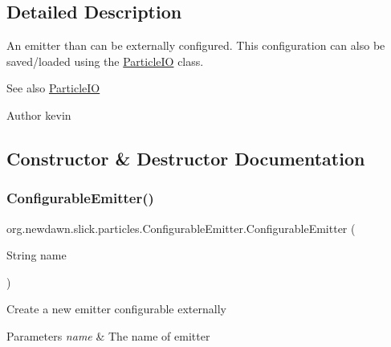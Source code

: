 \subsection{Detailed Description}
An emitter than can be externally configured. This configuration can also be saved/loaded using the \mbox{\hyperlink{classorg_1_1newdawn_1_1slick_1_1particles_1_1_particle_i_o}{Particle\+IO}} class.

\begin{DoxySeeAlso}{See also}
\mbox{\hyperlink{classorg_1_1newdawn_1_1slick_1_1particles_1_1_particle_i_o}{Particle\+IO}}
\end{DoxySeeAlso}
\begin{DoxyAuthor}{Author}
kevin 
\end{DoxyAuthor}


\subsection{Constructor \& Destructor Documentation}
\mbox{\label{classorg_1_1newdawn_1_1slick_1_1particles_1_1_configurable_emitter_ad86bb9c713312612cc48cf2097a50196}} 
\subsubsection{\texorpdfstring{Configurable\+Emitter()}{ConfigurableEmitter()}}
{\footnotesize\ttfamily org.\+newdawn.\+slick.\+particles.\+Configurable\+Emitter.\+Configurable\+Emitter (\begin{DoxyParamCaption}\item[{String}]{name }\end{DoxyParamCaption})\hspace{0.3cm}{\ttfamily [inline]}}

Create a new emitter configurable externally


\begin{DoxyParams}{Parameters}
{\em name} & The name of emitter \\
\hline
\end{DoxyParams}

